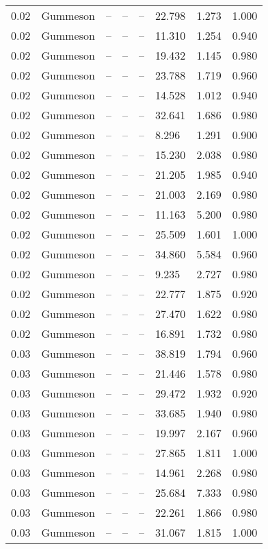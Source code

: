 \begin{table}[H]
\begin{tabular}{l c l l l}
0.02 & Gummeson & -- & -- & -- & 22.798 & 1.273 & 1.000 \\
0.02 & Gummeson & -- & -- & -- & 11.310 & 1.254 & 0.940 \\
0.02 & Gummeson & -- & -- & -- & 19.432 & 1.145 & 0.980 \\
0.02 & Gummeson & -- & -- & -- & 23.788 & 1.719 & 0.960 \\
0.02 & Gummeson & -- & -- & -- & 14.528 & 1.012 & 0.940 \\
0.02 & Gummeson & -- & -- & -- & 32.641 & 1.686 & 0.980 \\
0.02 & Gummeson & -- & -- & -- & 8.296 & 1.291 & 0.900 \\
0.02 & Gummeson & -- & -- & -- & 15.230 & 2.038 & 0.980 \\
0.02 & Gummeson & -- & -- & -- & 21.205 & 1.985 & 0.940 \\
0.02 & Gummeson & -- & -- & -- & 21.003 & 2.169 & 0.980 \\
0.02 & Gummeson & -- & -- & -- & 11.163 & 5.200 & 0.980 \\
0.02 & Gummeson & -- & -- & -- & 25.509 & 1.601 & 1.000 \\
0.02 & Gummeson & -- & -- & -- & 34.860 & 5.584 & 0.960 \\
0.02 & Gummeson & -- & -- & -- & 9.235 & 2.727 & 0.980 \\
0.02 & Gummeson & -- & -- & -- & 22.777 & 1.875 & 0.920 \\
0.02 & Gummeson & -- & -- & -- & 27.470 & 1.622 & 0.980 \\
0.02 & Gummeson & -- & -- & -- & 16.891 & 1.732 & 0.980 \\
0.03 & Gummeson & -- & -- & -- & 38.819 & 1.794 & 0.960 \\
0.03 & Gummeson & -- & -- & -- & 21.446 & 1.578 & 0.980 \\
0.03 & Gummeson & -- & -- & -- & 29.472 & 1.932 & 0.920 \\
0.03 & Gummeson & -- & -- & -- & 33.685 & 1.940 & 0.980 \\
0.03 & Gummeson & -- & -- & -- & 19.997 & 2.167 & 0.960 \\
0.03 & Gummeson & -- & -- & -- & 27.865 & 1.811 & 1.000 \\
0.03 & Gummeson & -- & -- & -- & 14.961 & 2.268 & 0.980 \\
0.03 & Gummeson & -- & -- & -- & 25.684 & 7.333 & 0.980 \\
0.03 & Gummeson & -- & -- & -- & 22.261 & 1.866 & 0.980 \\
0.03 & Gummeson & -- & -- & -- & 31.067 & 1.815 & 1.000 \\

\end{tabular}
\end{table}
